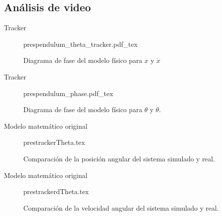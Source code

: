 \documentclass{beamer}
\begin{document}
\subsection{Análisis de video}

\begin{frame}{Tracker}
 \begin{figure}[htb!]
 \centering
{prespendulum_theta_tracker.pdf_tex}
 \caption{Diagrama de fase del modelo físico para $x$ y $\dot{x}$}
 \label{fig: tracker theta}
\end{figure}
\end{frame}


\begin{frame}{Tracker}
 \begin{figure}[htb!]
 \centering
{prespendulum_phase.pdf_tex}
 \caption{Diagrama de fase del modelo físico para $\theta$ y $\dot \theta$.}
 \label{fig: tracker phase diagram theta dtheta}
\end{figure}
\end{frame}


\begin{frame}{Modelo matemático original}
\begin{figure}[htb!]
 \centering
{prestrackerTheta.tex}
 \caption{Comparación de la posición angular del sistema simulado y real.}
 \label{fig: time tracker theta}
\end{figure}
\end{frame}

\begin{frame}{Modelo matemático original}
 \begin{figure}[htb!]
 \centering
{prestrackerdTheta.tex}
 \caption{Comparación de la velocidad angular del sistema simulado y real.}
 \label{fig: time tracker dtheta}
\end{figure}
\end{frame}
\end{document}
